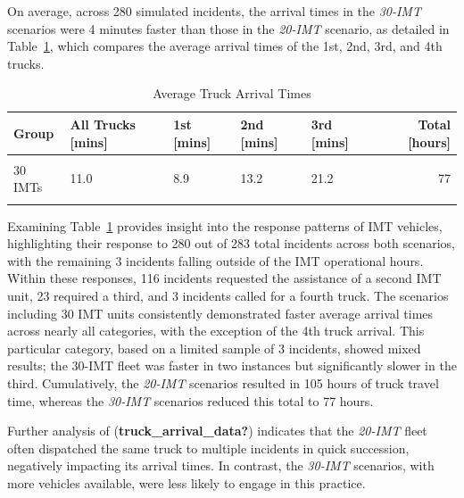 \documentclass[fancy, oneside, mastersfancy, ms]{byuthesis}
\begin{document}
On average, across 280 simulated incidents, the arrival times in the
\emph{30-IMT} scenarios were 4 minutes faster than those in the
\emph{20-IMT} scenario, as detailed in
Table~\ref{tbl-truck_arrival_table}, which compares the average arrival
times of the 1st, 2nd, 3rd, and 4th trucks.

\hypertarget{tbl-truck_arrival_table}{}
\begin{table}
\caption{\label{tbl-truck_arrival_table}Average Truck Arrival Times }\tabularnewline

\centering
\begin{tabular}[t]{lllllr}
\toprule
\textbf{Group} & \textbf{All Trucks [mins]} & \textbf{1st [mins]} & \textbf{2nd [mins]} & \textbf{3rd [mins]} & \textbf{Total [hours]}\\
\midrule
\cellcolor{gray!6}{20 IMTs} & \cellcolor{gray!6}{15.0} & \cellcolor{gray!6}{11.1} & \cellcolor{gray!6}{21.1} & \cellcolor{gray!6}{28.9} & \cellcolor{gray!6}{105}\\
30 IMTs & 11.0 & 8.9 & 13.2 & 21.2 & 77\\
\cellcolor{gray65}{\cellcolor{gray!6}{\# of Incidents}} & \cellcolor{gray65}{\cellcolor{gray!6}{280}} & \cellcolor{gray65}{\cellcolor{gray!6}{280}} & \cellcolor{gray65}{\cellcolor{gray!6}{116}} & \cellcolor{gray65}{\cellcolor{gray!6}{23}} & \cellcolor{gray65}{\cellcolor{gray!6}{280}}\\
\bottomrule
\end{tabular}
\end{table}

Examining Table~\ref{tbl-truck_arrival_table} provides insight into the
response patterns of IMT vehicles, highlighting their response to 280
out of 283 total incidents across both scenarios, with the remaining 3
incidents falling outside of the IMT operational hours. Within these
responses, 116 incidents requested the assistance of a second IMT unit,
23 required a third, and 3 incidents called for a fourth truck. The
scenarios including 30 IMT units consistently demonstrated faster
average arrival times across nearly all categories, with the exception
of the 4th truck arrival. This particular category, based on a limited
sample of 3 incidents, showed mixed results; the 30-IMT fleet was faster
in two instances but significantly slower in the third. Cumulatively,
the \emph{20-IMT} scenarios resulted in 105 hours of truck travel time,
whereas the \emph{30-IMT} scenarios reduced this total to 77 hours.

Further analysis of (\textbf{truck\_arrival\_data?}) indicates that the
\emph{20-IMT} fleet often dispatched the same truck to multiple
incidents in quick succession, negatively impacting its arrival times.
In contrast, the \emph{30-IMT} scenarios, with more vehicles available,
were less likely to engage in this practice.
\end{document}
